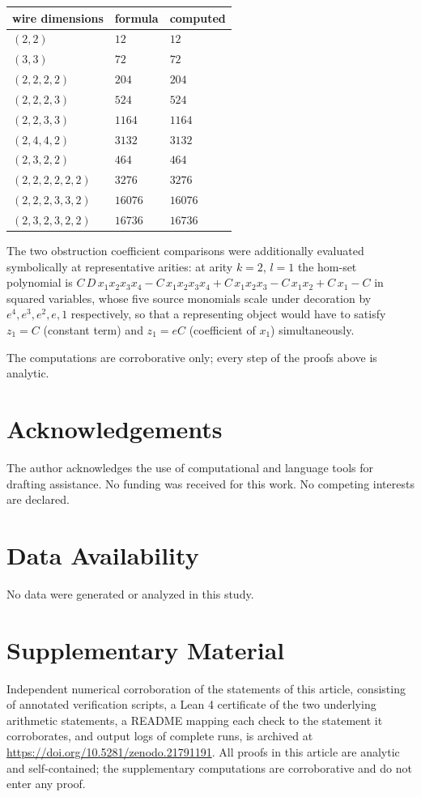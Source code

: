 \documentclass[11pt,a4paper]{article}
\theoremstyle{definition}
\theoremstyle{plain}
\theoremstyle{remark}
\begin{document}
\begin{center}
\begin{tabular}{lll}
wire dimensions & formula & computed \\
\hline
$(2,2)$ & $12$ & $12$\\
$(3,3)$ & $72$ & $72$\\
$(2,2,2,2)$ & $204$ & $204$\\
$(2,2,2,3)$ & $524$ & $524$\\
$(2,2,3,3)$ & $1164$ & $1164$\\
$(2,4,4,2)$ & $3132$ & $3132$\\
$(2,3,2,2)$ & $464$ & $464$\\
$(2,2,2,2,2,2)$ & $3276$ & $3276$\\
$(2,2,2,3,3,2)$ & $16076$ & $16076$\\
$(2,3,2,3,2,2)$ & $16736$ & $16736$
\end{tabular}
\end{center}

The two obstruction coefficient comparisons were additionally evaluated
symbolically at representative arities: at arity $k=2$, $l=1$ the hom-set
polynomial is
$C\,D\,x_1x_2x_3x_4-C\,x_1x_2x_3x_4+C\,x_1x_2x_3-C\,x_1x_2+C\,x_1-C$ in
squared variables, whose five source monomials scale under decoration by
$e^4,e^3,e^2,e,1$ respectively, so that a representing object would have to
satisfy $z_1=C$ (constant term) and $z_1=eC$ (coefficient of $x_1$)
simultaneously.

The computations are corroborative only; every step of the proofs above is
analytic.

\section*{Acknowledgements}
The author acknowledges the use of computational and language tools for drafting assistance. No funding was received for this work. No competing interests are declared.

\section*{Data Availability}
No data were generated or analyzed in this study.

\section*{Supplementary Material}
Independent numerical corroboration of the statements of this article,
consisting of annotated verification scripts, a Lean 4 certificate of
the two underlying arithmetic statements, a README mapping each check to
the statement it corroborates, and output logs of complete runs, is
archived at \url{https://doi.org/10.5281/zenodo.21791191}.
All proofs in this article are analytic and self-contained; the
supplementary computations are corroborative and do not enter any proof.
\end{document}
